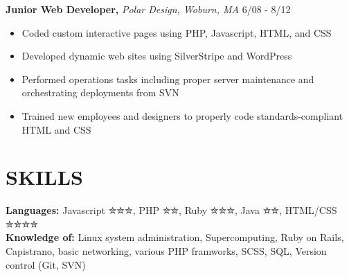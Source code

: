 \documentclass[line, margin]{res}
\begin{document}
\begin{resume}
\begin{itemize}
\end{itemize}
\textbf{Junior Web Developer,} \textit{Polar Design, Woburn, MA} \hfill 6/08 - 8/12
\begin{itemize}
    \item Coded custom interactive pages using PHP, Javascript, HTML, and CSS
    \item Developed dynamic web sites using SilverStripe and WordPress
    \item Performed operations tasks including proper server maintenance and orchestrating deployments from SVN
    \item Trained new employees and designers to properly code standards-compliant HTML and CSS
\end{itemize}

\section{SKILLS}
\textbf{Languages: }Javascript {\dingbats ✮✮✮}, PHP {\dingbats ✮✮}, Ruby {\dingbats ✮✮✮}, Java {\dingbats ✮✮}, HTML/CSS {\dingbats ✮✮✮✮} \\
\textbf{Knowledge of: }Linux system administration, Supercomputing, Ruby on Rails, Capistrano, basic networking, various PHP framworks, SCSS, SQL, Version control (Git, SVN)
\end{resume}
\end{document}
